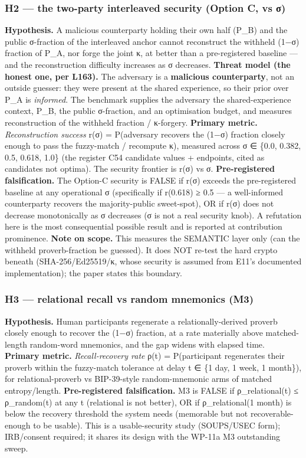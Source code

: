 \documentclass[
  11pt,
]{article}
\begin{document}
\subsubsection{H2 --- the two-party interleaved security (Option C, vs
σ)}\label{h2-the-two-party-interleaved-security-option-c-vs-ux3c3}

\textbf{Hypothesis.} A malicious counterparty holding their own half
(P\_B) and the public σ-fraction of the interleaved anchor cannot
reconstruct the withheld (1−σ) fraction of P\_A, nor forge the joint κ,
at better than a pre-registered baseline --- and the reconstruction
difficulty increases as σ decreases. \textbf{Threat model (the honest
one, per L163).} The adversary is a \textbf{malicious counterparty}, not
an outside guesser: they were present at the shared experience, so their
prior over P\_A is \emph{informed}. The benchmark supplies the adversary
the shared-experience context, P\_B, the public σ-fraction, and an
optimisation budget, and measures reconstruction of the withheld
fraction / κ-forgery. \textbf{Primary metric.} \emph{Reconstruction
success} r(σ) = P(adversary recovers the (1−σ) fraction closely enough
to pass the fuzzy-match / recompute κ), measured across σ ∈ \{0.0,
0.382, 0.5, 0.618, 1.0\} (the register C54 candidate values + endpoints,
cited as candidates not optima). The security frontier is r(σ) vs σ.
\textbf{Pre-registered falsification.} The Option-C security is FALSE if
r(σ) exceeds the pre-registered baseline at any operational σ
(specifically if r(0.618) ≥ 0.5 --- a well-informed counterparty
recovers the majority-public sweet-spot), OR if r(σ) does not decrease
monotonically as σ decreases (σ is not a real security knob). A
refutation here is the most consequential possible result and is
reported at contribution prominence. \textbf{Note on scope.} This
measures the SEMANTIC layer only (can the withheld proverb-fraction be
guessed). It does NOT re-test the hard crypto beneath
(SHA-256/Ed25519/κ, whose security is assumed from E11's documented
implementation); the paper states this boundary.

\subsubsection{H3 --- relational recall vs random mnemonics
(M3)}\label{h3-relational-recall-vs-random-mnemonics-m3}

\textbf{Hypothesis.} Human participants regenerate a
relationally-derived proverb closely enough to recover the (1−σ)
fraction, at a rate materially above matched-length random-word
mnemonics, and the gap widens with elapsed time. \textbf{Primary
metric.} \emph{Recall-recovery rate} ρ(t) = P(participant regenerates
their proverb within the fuzzy-match tolerance at delay t ∈ \{1 day, 1
week, 1 month\}), for relational-proverb vs BIP-39-style random-mnemonic
arms of matched entropy/length. \textbf{Pre-registered falsification.}
M3 is FALSE if ρ\_relational(t) ≤ ρ\_random(t) at any t (relational is
not better), OR if ρ\_relational(1 month) is below the recovery
threshold the system needs (memorable but not recoverable-enough to be
usable). This is a usable-security study (SOUPS/USEC form); IRB/consent
required; it shares its design with the WP-11a M3 outstanding sweep.
\end{document}
